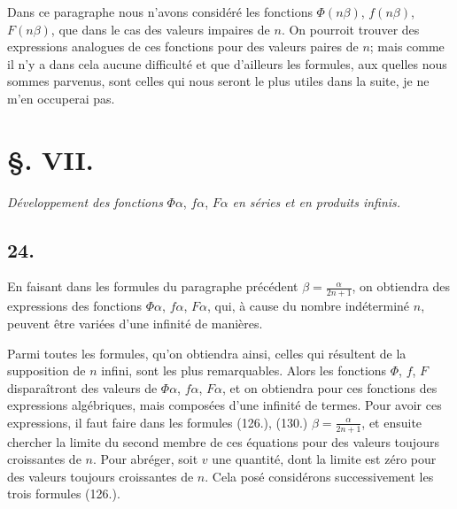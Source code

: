 \documentclass{article}
\begin{document}
Dans ce paragraphe nous n'avons considéré les fonctions $\Phi(n\beta)$, $f(n\beta)$, $F(n\beta)$, que dans le cas des valeurs impaires de $n$. On pourroit trouver des expressions analogues de ces fonctions pour des valeurs paires de $n$; mais comme il n'y a dans cela aucune difficulté et que d'ailleurs les formules, aux quelles nous sommes parvenus, sont celles qui nous seront le plus utiles dans la suite, je ne m'en occuperai pas.

\section*{§. VII.}

\emph{Développement des fonctions} $\Phi\alpha$, $f\alpha$, $F\alpha$ \emph{en séries et en produits infinis.}

\subsection*{24.}

En faisant dans les formules du paragraphe précédent $\beta=\frac{\alpha}{2n+1}$, on obtiendra des expressions des fonctions $\Phi\alpha$, $f\alpha$, $F\alpha$, qui, à cause du nombre indéterminé $n$, peuvent être variées d'une infinité de manières.

Parmi toutes les formules, qu'on obtiendra ainsi, celles qui résultent de la supposition de $n$ infini, sont les plus remarquables. Alors les fonctions $\Phi$, $f$, $F$ disparaîtront des valeurs de $\Phi\alpha$, $f\alpha$, $F\alpha$, et on obtiendra pour ces fonctions des expressions algébriques, mais composées d'une infinité de termes. Pour avoir ces expressions, il faut faire dans les formules (126.), (130.) $\beta=\frac{\alpha}{2n+1}$, et ensuite chercher la limite du second membre de ces équations pour des valeurs toujours croissantes de $n$. Pour abréger, soit $v$ une quantité, dont la limite est zéro pour des valeurs toujours croissantes de $n$. Cela posé considérons successivement les trois formules (126.).
\end{document}

